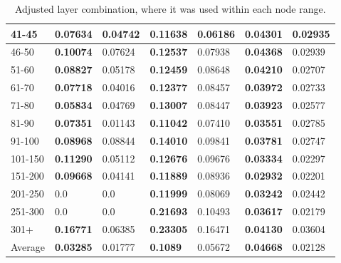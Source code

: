 \begin{table*}[]
\begin{tabular}{|l|l|l||l|l||l|l|}
        41-45   & \textbf{0.07634}                        & 0.04742                        & \textbf{0.11638}                 & 0.06186          & \textbf{0.04301} & 0.02935          \\ \hline
        46-50   & \textbf{0.10074}                        & 0.07624                        & \textbf{0.12537}                 & 0.07938          & \textbf{0.04368} & 0.02939          \\ \hline
        51-60   & \textbf{0.08827}                        & 0.05178                        & \textbf{0.12459}                 & 0.08648          & \textbf{0.04210} & 0.02707          \\ \hline
        61-70   & \textbf{0.07718}                        & 0.04016                        & \textbf{0.12377}                 & 0.08457          & \textbf{0.03972} & 0.02733          \\ \hline
        71-80   & \textbf{0.05834}                        & 0.04769                        & \textbf{0.13007}                 & 0.08447          & \textbf{0.03923} & 0.02577          \\ \hline
        81-90   & \textbf{0.07351}                        & 0.01143                        & \textbf{0.11042}                 & 0.07410          & \textbf{0.03551} & 0.02785          \\ \hline
        91-100  & \textbf{0.08968}                        & 0.08844                        & \textbf{0.14010}                 & 0.09841          & \textbf{0.03781} & 0.02747          \\ \hline
        101-150 & \textbf{0.11290}                        & 0.05112                        & \textbf{0.12676}                 & 0.09676          & \textbf{0.03334} & 0.02297          \\ \hline
        151-200 & \textbf{0.09668}                        & 0.04141                        & \textbf{0.11889}                 & 0.08936          & \textbf{0.02932} & 0.02201          \\ \hline
        201-250 & 0.0                                     & 0.0                            & \textbf{0.11999}                 & 0.08069          & \textbf{0.03242} & 0.02442          \\ \hline
        251-300 & 0.0                                     & 0.0                            & \textbf{0.21693}                 & 0.10493          & \textbf{0.03617} & 0.02179          \\ \hline
        301+    & \textbf{0.16771}                        & 0.06385                        & \textbf{0.23305}                 & 0.16471          & \textbf{0.04130} & 0.03604          \\ \hline
        Average & \textbf{0.03285}                        & 0.01777                        & \textbf{0.1089 }                 & 0.05672          & \textbf{0.04668} & 0.02128          \\ \hline
    \end{tabular}
    \caption{Adjusted layer combination, where it was used within each node range.}
    \label{tab:ndcg-adjusted-layer-bad-performance}
\end{table*}

